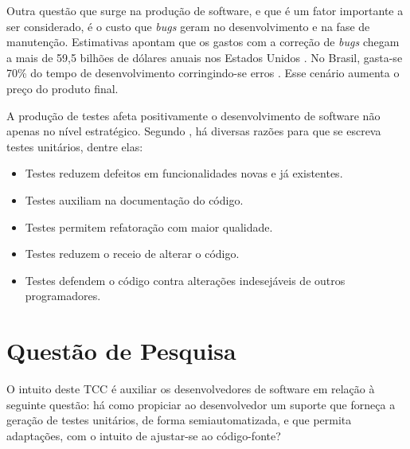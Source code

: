   \par
  \indent Outra questão que surge na produção de software, e que é um fator importante a ser considerado, é o custo que \textit{bugs} geram no desenvolvimento e na fase de manutenção. Estimativas apontam que os gastos com a correção de \textit{bugs} chegam a mais de 59,5 bilhões de dólares anuais nos Estados Unidos \cite{jantti2008}. No Brasil, gasta-se 70\% do tempo de desenvolvimento corringindo-se erros \cite{janones2010}. Esse cenário aumenta o preço do produto final.
  \par
  \indent A produção de testes afeta positivamente o desenvolvimento de software não apenas no nível estratégico. Segundo , há diversas razões para que se escreva testes unitários, dentre elas:
  \begin{itemize}
    \item Testes reduzem defeitos em funcionalidades novas e já existentes.
    \item Testes auxiliam na documentação do código.
    \item Testes permitem refatoração com maior qualidade.
    \item Testes reduzem o receio de alterar o código.
    \item Testes defendem o código contra alterações indesejáveis de outros programadores.
  \end{itemize}

 \section{Questão de Pesquisa}
O intuito deste TCC é auxiliar os desenvolvedores de software em relação à seguinte questão: há como propiciar ao desenvolvedor um suporte que forneça a geração de testes unitários, de forma semiautomatizada, e que permita adaptações, com o intuito de ajustar-se ao código-fonte?


